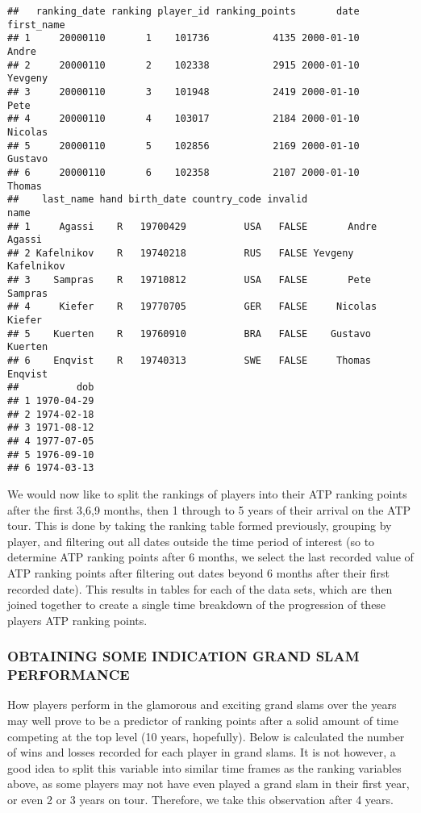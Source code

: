 \documentclass[]{article}
\begin{document}
\begin{verbatim}
##   ranking_date ranking player_id ranking_points       date first_name
## 1     20000110       1    101736           4135 2000-01-10      Andre
## 2     20000110       2    102338           2915 2000-01-10    Yevgeny
## 3     20000110       3    101948           2419 2000-01-10       Pete
## 4     20000110       4    103017           2184 2000-01-10    Nicolas
## 5     20000110       5    102856           2169 2000-01-10    Gustavo
## 6     20000110       6    102358           2107 2000-01-10     Thomas
##    last_name hand birth_date country_code invalid               name
## 1     Agassi    R   19700429          USA   FALSE       Andre Agassi
## 2 Kafelnikov    R   19740218          RUS   FALSE Yevgeny Kafelnikov
## 3    Sampras    R   19710812          USA   FALSE       Pete Sampras
## 4     Kiefer    R   19770705          GER   FALSE     Nicolas Kiefer
## 5    Kuerten    R   19760910          BRA   FALSE    Gustavo Kuerten
## 6    Enqvist    R   19740313          SWE   FALSE     Thomas Enqvist
##          dob
## 1 1970-04-29
## 2 1974-02-18
## 3 1971-08-12
## 4 1977-07-05
## 5 1976-09-10
## 6 1974-03-13
\end{verbatim}

We would now like to split the rankings of players into their ATP
ranking points after the first 3,6,9 months, then 1 through to 5 years
of their arrival on the ATP tour. This is done by taking the ranking
table formed previously, grouping by player, and filtering out all dates
outside the time period of interest (so to determine ATP ranking points
after 6 months, we select the last recorded value of ATP ranking points
after filtering out dates beyond 6 months after their first recorded
date). This results in tables for each of the data sets, which are then
joined together to create a single time breakdown of the progression of
these players ATP ranking points.

\subsubsection{OBTAINING SOME INDICATION GRAND SLAM
PERFORMANCE}\label{obtaining-some-indication-grand-slam-performance}

How players perform in the glamorous and exciting grand slams over the
years may well prove to be a predictor of ranking points after a solid
amount of time competing at the top level (10 years, hopefully). Below
is calculated the number of wins and losses recorded for each player in
grand slams. It is not however, a good idea to split this variable into
similar time frames as the ranking variables above, as some players may
not have even played a grand slam in their first year, or even 2 or 3
years on tour. Therefore, we take this observation after 4 years.
\end{document}
